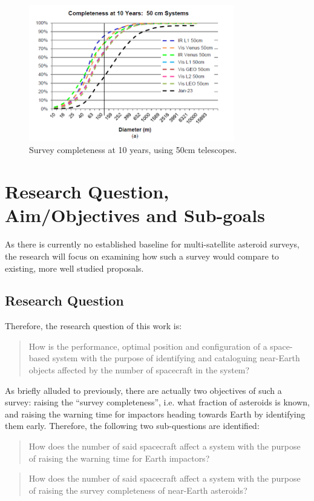 \documentclass[12pt, english, NoHyper]{AE4010-template}
\begin{document}
\begin{figure}[thb]
 \centering
 \includegraphics[width=0.8\textwidth]{figures/surveycompleteness.png}
 \caption{Survey completeness at 10 years, using 50cm telescopes.}
 \label{fig:surveycompleteness}
\end{figure}


\section{Research Question, Aim/Objectives and Sub-goals}
As there is currently no established baseline for multi-satellite asteroid surveys, the research will focus on examining how such a survey would compare to existing, more well studied proposals.

\subsection{Research Question}
Therefore, the research question of this work is:

\begin{quote}
 How is the performance, optimal position and configuration of a space-based system with the purpose of identifying and cataloguing near-Earth objects affected by the number of spacecraft in the system?
\end{quote}

As briefly alluded to previously, there are actually two objectives of such a survey: raising the ``survey completeness'', i.e. what fraction of asteroids is known, and raising the warning time for impactors heading towards Earth by identifying them early. Therefore, the following two sub-questions are identified:

\begin{quote}
 How does the number of said spacecraft affect a system with the purpose of raising the warning time for Earth impactors?
\end{quote}
\begin{quote}
 How does the number of said spacecraft affect a system with the purpose of raising the survey completeness of near-Earth asteroids?
\end{quote}
\end{document}
